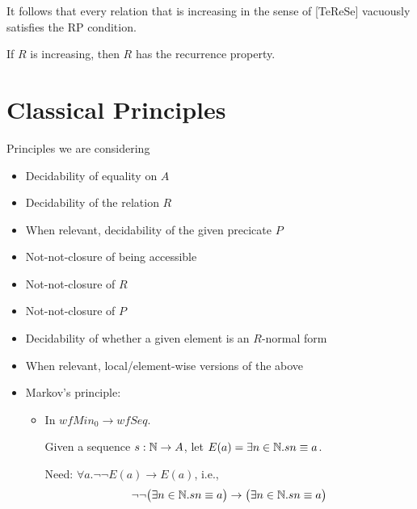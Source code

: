 \documentclass{scrartcl}
\begin{document}
It follows that every relation that is increasing in the sense of [TeReSe]
vacuously satisfies the RP condition.

\begin{cor}
  If $R$ is increasing, then $R$ has the recurrence property.
\end{cor}


\section{Classical Principles}
Principles we are considering
\begin{itemize}
  \item Decidability of equality on $A$
  \item Decidability of the relation $R$
  \item When relevant, decidability of the given precicate $P$
  \item Not-not-closure of being accessible
  \item Not-not-closure of $R$
  \item Not-not-closure of $P$
  \item Decidability of whether a given element is an $R$-normal form
  \item When relevant, local/element-wise versions of the above
  \item Markov's principle:
  \begin{itemize}
    \item In $wfMin_0 \to wfSeq$.

    Given a sequence $s : \mathbb{N} \to A$, let $E(a) = \exists n \in \mathbb{N}. s n \equiv a$.

    Need: $\forall a. \lnot\lnot E(a) \to E(a)$, i.e.,
    \[\lnot\lnot \big(\exists n \in \mathbb{N}. s n \equiv a\big)
          \to \big(\exists n \in \mathbb{N}. s n \equiv a\big)\]

  \end{itemize}
\end{itemize}
\end{document}
